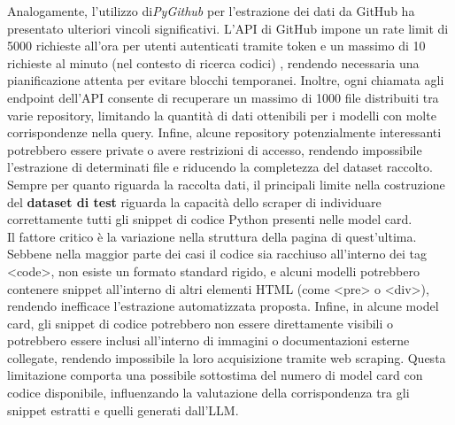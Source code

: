 \documentclass{article}
\begin{document}
Analogamente, l’utilizzo di\textit{PyGithub} per l'estrazione dei dati da GitHub ha presentato ulteriori vincoli significativi. L’API di GitHub impone un rate limit di 5000 richieste all’ora per utenti autenticati tramite token e un massimo di 10 richieste al minuto (nel contesto di ricerca codici) , rendendo necessaria una pianificazione attenta per evitare blocchi temporanei. Inoltre, ogni chiamata agli endpoint dell’API consente di recuperare un massimo di 1000 file distribuiti tra varie repository, limitando la quantità di dati ottenibili per i modelli con molte corrispondenze nella query. Infine, alcune repository potenzialmente interessanti potrebbero essere private o avere restrizioni di accesso, rendendo impossibile l’estrazione di determinati file e riducendo la completezza del dataset raccolto.\\
Sempre per quanto riguarda la raccolta dati, il principali limite nella costruzione del \textbf{dataset di test} riguarda la capacità dello scraper di individuare correttamente tutti gli snippet di codice Python presenti nelle model card.\\
Il fattore critico è la variazione nella struttura della pagina di quest'ultima. Sebbene nella maggior parte dei casi il codice sia racchiuso all'interno dei tag <code>, non esiste un formato standard rigido, e alcuni modelli potrebbero contenere snippet all’interno di altri elementi HTML (come <pre> o <div>), rendendo inefficace l’estrazione automatizzata proposta.
Infine, in alcune model card, gli snippet di codice potrebbero non essere direttamente visibili o potrebbero essere inclusi all'interno di immagini o documentazioni esterne collegate, rendendo impossibile la loro acquisizione tramite web scraping. Questa limitazione comporta una possibile sottostima del numero di model card con codice disponibile, influenzando la valutazione della corrispondenza tra gli snippet estratti e quelli generati dall’LLM.\\
\end{document}
